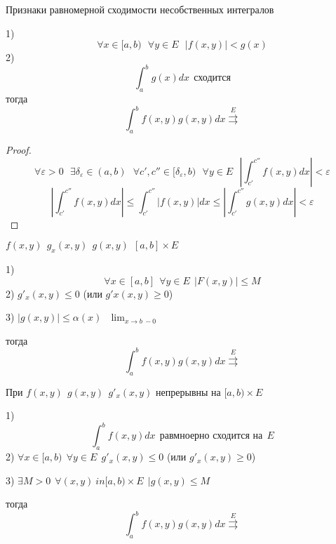 \begin{title}[\Large]
  Признаки равномерной сходимости несобственных интегралов
\end{title}

\begin{block}
  1)
  $$
  \forall  x \in [a, b)
  ~~~
  \forall y \in E
  ~~~
  |f(x, y)| < g(x)
  $$
  2)
  $$
  \int_a^b g(x) dx ~~ \text{сходится}
  $$
  тогда
  $$
  \int_a^b f(x,y) g(x,y) dx \stackrel{E}{\rightrightarrows}
  $$
\end{block}

\begin{proof}
  $$
  \forall \varepsilon > 0
  ~~~
  \exists \delta_{\varepsilon} \in (a,b)
  ~~~
  \forall c', c'' \in [\delta_{\varepsilon}, b)
  ~~~
  \forall y \in E
  ~~~
  \left|
    \int_{c'}^{c''} f(x,y) dx
  \right|
  < \varepsilon
  $$
  $$
  \left|
    \int_{c'}^{c''} f(x,y) dx
  \right|
  \le
  \int_{c'}^{c''} |f(x,y)| dx
  \le
  \left|
    \int_{c'}^{c''} g(x,y) dx
  \right|
  < \varepsilon
  $$
\end{proof}

\begin{block}
  $f(x,y) ~~ g_x(x,y) ~~ g(x,y) ~~ [a,b] \times E$

  1)
  $$
  \forall x \in [a, b]
  ~~
  \forall y \in E
  ~~
  | F(x, y)| \le M
  $$
  2) $g'_x (x,y) \le 0$ (или $g'x(x,y) \ge 0$)

  3) $|g(x,y)| \le \alpha(x) ~~~ \lim_{x \to b ~ -0}$

  тогда
  $$
  \int_a^b f(x,y) g(x,y) dx \stackrel{E}{\rightrightarrows}
  $$
\end{block}

\begin{block}
  При $f(x,y) ~~ g(x,y) ~~ g'_x(x,y)$ непрерывны на $[a,b) \times E$

  1)
  $$
  \int_a^b f(x,y) dx ~~ \text{равмноерно сходится на} ~~ E
  $$
  2) $\forall x \in [a,b) ~~ \forall y \in E ~~ g'_x(x,y) \le 0$ (или
  $g'_x(x,y) \ge 0$)

  3) $\exists M > 0 ~~ \forall (x,y) \ in [a,b) \times E ~~ |g(x,y) \le M$

  тогда
  $$
  \int_a^b f(x,y) g(x,y) dx \stackrel{E}{\rightrightarrows}
  $$
\end{block}
